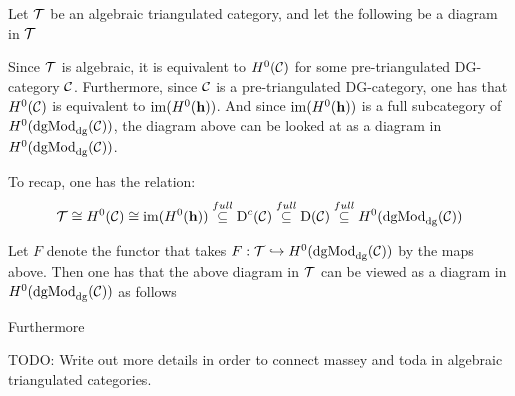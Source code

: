 \begin{remark}
    Let \( {\mathcal{T}} \) be an algebraic triangulated category, and let the following be a diagram in \( {\mathcal{T}} \)
    \begin{center}
    \end{center}

    Since \( {\mathcal{T}} \) is algebraic, it is equivalent to \( H^0({\mathcal{C}}) \) for some pre-triangulated DG-category \( {\mathcal{C}} \). Furthermore, since \( {\mathcal{C}} \) is a pre-triangulated DG-category, one has that \( H^0({\mathcal{C}}) \) is equivalent to \( \operatorname{im}(H^0(\mathbf{h})) \). And since \( \operatorname{im}(H^0(\mathbf{h})) \) is a full subcategory of \( H^0(\operatorname{dgMod}_{\operatorname{dg}}({\mathcal{C}})) \), the diagram above can be looked at as a diagram in \( H^0(\operatorname{dgMod}_{\operatorname{dg}}({\mathcal{C}})) \).

    To recap, one has the relation:
    \[
        {\mathcal{T}} \cong H^0({\mathcal{C}}) \cong \operatorname{im}(H^0(\mathbf{h})) \stackrel{full}{\subseteq} \operatorname{D}^c({\mathcal{C}}) \stackrel{full}{\subseteq} \operatorname{D}({\mathcal{C}}) \stackrel{full}{\subseteq} H^0(\operatorname{dgMod}_{\operatorname{dg}}({\mathcal{C}}))
    \]

    Let \( F \) denote the functor that takes \( F: {\mathcal{T}} \hookrightarrow H^0(\operatorname{dgMod}_{\operatorname{dg}}({\mathcal{C}})) \) by the maps above. Then one has that the above diagram in \( {\mathcal{T}} \) can be viewed as a diagram in \( H^0(\operatorname{dgMod}_{\operatorname{dg}}({\mathcal{C}})) \) as follows
    \begin{center}
    \end{center}
    
    Furthermore

    TODO: Write out more details in order to connect massey and toda in algebraic triangulated categories.
\end{remark}

